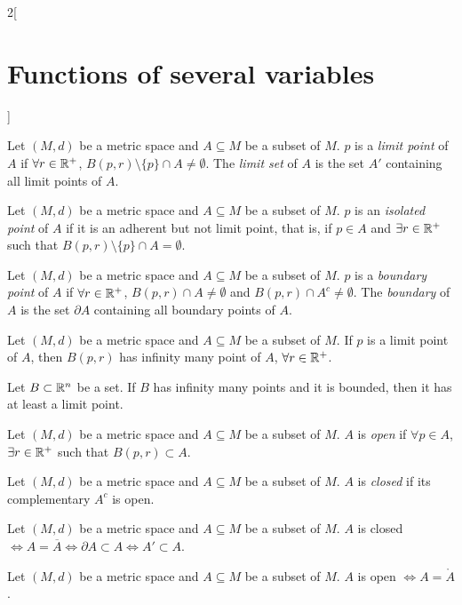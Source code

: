 \documentclass[../../../main.tex]{subfiles}
\begin{document}
\begin{multicols}{2}[\section{Functions of several variables}]
\begin{definition}
\end{definition}
\begin{definition}
Let $(M,d)$ be a metric space and $A\subseteq M$ be a subset of $M$. $p$ is a \textit{limit point} of $A$ if $\forall r\in\mathbb{R}^+$, $B(p,r)\setminus\{p\}\cap A\ne\emptyset$. The \textit{limit set} of $A$ is the set $A'$ containing all limit points of $A$.
\end{definition}
\begin{definition}
Let $(M,d)$ be a metric space and $A\subseteq M$ be a subset of $M$. $p$ is an \textit{isolated point} of $A$ if it is an adherent but not limit point, that is, if $p\in A$ and $\exists r\in\mathbb{R}^+$ such that $B(p,r)\setminus\{p\}\cap A=\emptyset$.
\end{definition}
\begin{definition}
Let $(M,d)$ be a metric space and $A\subseteq M$ be a subset of $M$. $p$ is a \textit{boundary point} of $A$ if $\forall r\in\mathbb{R}^+$, $B(p,r)\cap A\ne\emptyset$ and $B(p,r)\cap A^c\ne\emptyset$. The \textit{boundary} of $A$ is the set $\partial A$ containing all boundary points of $A$.
\end{definition}
\begin{prop}
Let $(M,d)$ be a metric space and $A\subseteq M$ be a subset of $M$. If $p$ is a limit point of $A$, then $B(p,r)$ has infinity many point of $A$, $\forall r\in\mathbb{R}^+$.
\end{prop}
\begin{theorem}
Let $B\subset\mathbb{R}^n$ be a set. If $B$ has infinity many points and it is bounded, then it has at least a limit point.
\end{theorem}
\begin{definition}
Let $(M,d)$ be a metric space and $A\subseteq M$ be a subset of $M$. $A$ is \textit{open} if $\forall p\in A$, $\exists r\in\mathbb{R}^+$ such that $B(p,r)\subset A$.
\end{definition}
\begin{definition}
Let $(M,d)$ be a metric space and $A\subseteq M$ be a subset of $M$. $A$ is \textit{closed} if its complementary $A^c$ is open.
\end{definition}
\begin{prop} 
Let $(M,d)$ be a metric space and $A\subseteq M$ be a subset of $M$. $A$ is closed $\iff A=\overline{A}\iff\partial A\subset A\iff A'\subset A$.
\end{prop}
\begin{prop}
Let $(M,d)$ be a metric space and $A\subseteq M$ be a subset of $M$. $A$ is open $\iff A=\mathring A$.

\end{prop}
\end{multicols}
\end{document}
